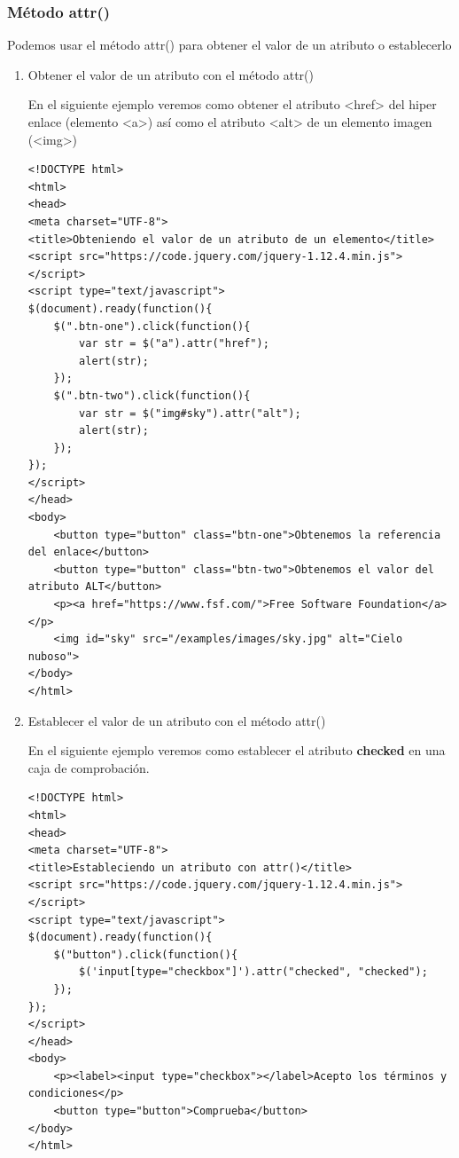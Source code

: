 \documentclass[a4paper, oneside]{article}
\begin{document}
\subsubsection{Método attr()}
\label{sec:orgf71f971}

Podemos usar el método attr() para obtener el valor de un atributo o establecerlo

\begin{enumerate}
\item Obtener el valor de un atributo con el método attr()
\label{sec:orgedb82ba}

En el siguiente ejemplo veremos como obtener el atributo <href> del hiper enlace (elemento <a>) así como el atributo <alt> de un elemento imagen (<img>)

\begin{verbatim}
<!DOCTYPE html>
<html>
<head>
<meta charset="UTF-8">
<title>Obteniendo el valor de un atributo de un elemento</title>
<script src="https://code.jquery.com/jquery-1.12.4.min.js"></script>
<script type="text/javascript">
$(document).ready(function(){
    $(".btn-one").click(function(){
        var str = $("a").attr("href");
        alert(str);
    });
    $(".btn-two").click(function(){
        var str = $("img#sky").attr("alt");
        alert(str);
    });
});
</script>
</head>
<body>
    <button type="button" class="btn-one">Obtenemos la referencia del enlace</button>
    <button type="button" class="btn-two">Obtenemos el valor del atributo ALT</button>
    <p><a href="https://www.fsf.com/">Free Software Foundation</a></p>
    <img id="sky" src="/examples/images/sky.jpg" alt="Cielo nuboso">
</body>
</html>                                		
\end{verbatim}

\item Establecer el valor de un atributo con el método attr()
\label{sec:orgdd7b844}

En el siguiente ejemplo veremos como establecer el atributo \textbf{checked} en una caja de comprobación.

\begin{verbatim}
<!DOCTYPE html>
<html>
<head>
<meta charset="UTF-8">
<title>Estableciendo un atributo con attr()</title>
<script src="https://code.jquery.com/jquery-1.12.4.min.js"></script>
<script type="text/javascript">
$(document).ready(function(){
    $("button").click(function(){
        $('input[type="checkbox"]').attr("checked", "checked");
    });
});
</script>
</head>
<body>
    <p><label><input type="checkbox"></label>Acepto los términos y condiciones</p>
    <button type="button">Comprueba</button>
</body>
</html>                                		
\end{verbatim}
\end{enumerate}
\end{document}
